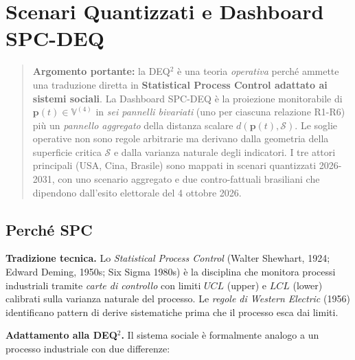 \chapter{Scenari Quantizzati e Dashboard
SPC-DEQ}\label{scenari-quantizzati-e-dashboard-spc-deq}

\begin{quote}
\textbf{Argomento portante:} la DEQ$^2$ è una teoria \emph{operativa}
perché ammette una traduzione diretta in \textbf{Statistical Process
Control adattato ai sistemi sociali}. La Dashboard SPC-DEQ è la
proiezione monitorabile di \(\boldsymbol{p}(t) \in \mathbb{V}^{(4)}\) in
\emph{sei pannelli bivariati} (uno per ciascuna relazione R1-R6) più un
\emph{pannello aggregato} della distanza scalare
\(d(\boldsymbol{p}(t), \mathcal{S})\). Le soglie operative non sono
regole arbitrarie ma derivano dalla geometria della superficie critica
\(\mathcal{S}\) e dalla varianza naturale degli indicatori. I tre attori
principali (USA, Cina, Brasile) sono mappati in scenari quantizzati
2026-2031, con uno scenario aggregato e due contro-fattuali brasiliani
che dipendono dall'esito elettorale del 4 ottobre 2026.
\end{quote}



\section{Perché SPC}\label{perchuxe9-spc}

\Hypoth{} \textbf{Tradizione tecnica.} Lo \emph{Statistical Process
Control} (Walter Shewhart, 1924; Edward Deming, 1950s; Six Sigma 1980s)
è la disciplina che monitora processi industriali tramite \emph{carte di
controllo} con limiti \(UCL\) (upper) e \(LCL\) (lower) calibrati sulla
varianza naturale del processo. Le \emph{regole di Western Electric}
(1956) identificano pattern di derive sistematiche prima che il processo
esca dai limiti.

\Hypoth{} \textbf{Adattamento alla DEQ$^2$.} Il sistema sociale è
formalmente analogo a un processo industriale con due differenze:

